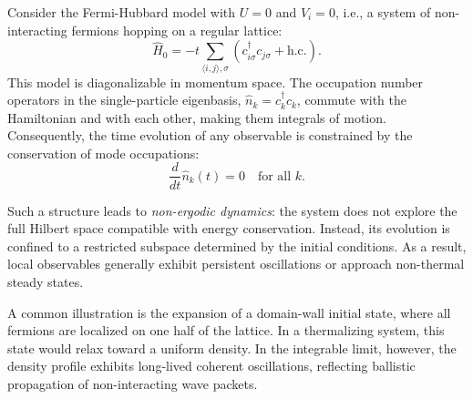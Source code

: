 Consider the Fermi-Hubbard model with $U = 0$ and $V_i = 0$, i.e., a system of non-interacting fermions hopping on a regular lattice:
\begin{equation}
\hat{H}_0 = -t \sum_{\langle i,j \rangle, \sigma} \left( c_{i\sigma}^\dagger c_{j\sigma} + \text{h.c.} \right).
\label{eq:free_ham}
\end{equation}
This model is diagonalizable in momentum space. The occupation number operators in the single-particle eigenbasis, $\hat{n}_k = c_k^\dagger c_k$, commute with the Hamiltonian and with each other, making them integrals of motion. Consequently, the time evolution of any observable is constrained by the conservation of mode occupations:
\begin{equation}
\frac{d}{dt} \hat{n}_k(t) = 0 \quad \text{for all } k.
\end{equation}

Such a structure leads to \textit{non-ergodic dynamics}: the system does not explore the full Hilbert space compatible with energy conservation. Instead, its evolution is confined to a restricted subspace determined by the initial conditions. As a result, local observables generally exhibit persistent oscillations or approach non-thermal steady states.

A common illustration is the expansion of a domain-wall initial state, where all fermions are localized on one half of the lattice. In a thermalizing system, this state would relax toward a uniform density. In the integrable limit, however, the density profile exhibits long-lived coherent oscillations, reflecting ballistic propagation of non-interacting wave packets.


